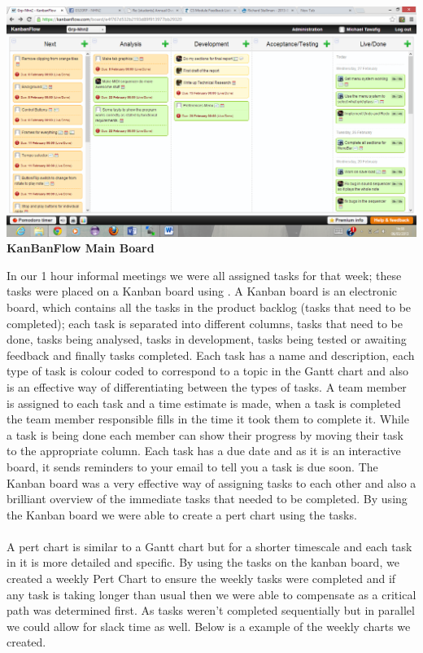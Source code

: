\documentclass[10pt,a4paper]{article}
\begin{document}
\\
\begin{center}
\includegraphics[scale=0.3]{kb.png}
\textbf{KanBanFlow Main Board}
\end{center}
In our 1 hour informal meetings we were all assigned tasks for that week; these tasks were placed on a Kanban board using \cite{kb}. A Kanban board is an electronic board, which contains all the tasks in the product backlog (tasks that need to be completed); each task is separated into different columns, tasks that need to be done, tasks being analysed, tasks in development, tasks being tested or awaiting feedback and finally tasks completed. Each task has a name and description, each type of task is colour coded to correspond to a topic in the Gantt chart and also is an effective way of differentiating between the types of tasks. A team member is assigned to each task and a time estimate is made, when a task is completed the team member responsible fills in the time it took them to complete it. While a task is being done each member can show their progress by moving their task to the appropriate column. Each task has a due date and as it is an interactive board, it sends reminders to your email to tell you a task is due soon. The Kanban board was a very effective way of assigning tasks to each other and also a brilliant overview of the immediate tasks that needed to be completed. By using the Kanban board we were able to create a pert chart using the tasks.\\
\\
 A pert chart is similar to a Gantt chart but for a shorter timescale and each task in it is more detailed and specific. By using the tasks on the kanban board, we created a weekly Pert Chart to ensure the weekly tasks were completed and if any task is taking longer than usual then we were able to compensate as a critical path was determined first. As tasks weren’t completed sequentially but in parallel we could allow for slack time as well. Below is a example of the weekly charts we created.\\
\end{document}
